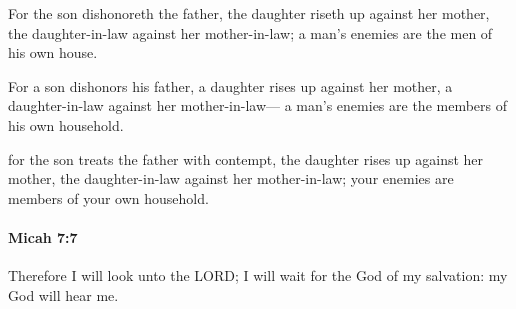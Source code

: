 			\begin{versebox}
					\item[BHS] 
					\item[LXX] 
					\item[ASV] For the son dishonoreth the father, the daughter riseth up against her mother, the daughter-in-law against her mother-in-law; a man's enemies are the men of his own house.
					\item[NIV] For a son dishonors his father, a daughter rises up against her mother, a daughter-in-law against her mother-in-law— a man’s enemies are the members of his own household.
					\item[NRSV] for the son treats the father with contempt, the daughter rises up against her mother, the daughter-in-law against her mother-in-law; your enemies are members of your own household.
			\end{versebox}

		\paragraph{Micah 7:7} %
			\label{MICAH-7-7}

			Therefore I will look unto the LORD; I will wait for the God of my salvation: my God will hear me.

